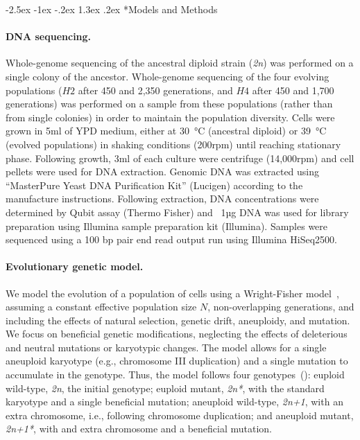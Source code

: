 \documentclass[12pt]{extarticle}
\makeatletter
\renewcommand\section{\@startsection {section}{1}{\z@}%
     {-2.5ex \@plus -1ex \@minus -.2ex}%
     {1.3ex \@plus.2ex}%
    {\Large\bfseries}}
\newcommand{\euwt}{\emph{2n}}
\newcommand{\anwt}{\emph{2n+1}}
\newcommand{\eumt}{\emph{2n*}}
\newcommand{\anmt}{\emph{2n+1*}}
\makeatother
\begin{document}
\section*{Models and Methods}

\paragraph{DNA sequencing.}
Whole-genome sequencing of the ancestral diploid strain (\euwt) was performed
on a single colony of the ancestor. Whole-genome sequencing of the four evolving populations ($H2$ after 450 and 2,350 generations, and $H4$ after 450 and 1,700 generations) was performed on a sample from these populations (rather than from single colonies) in order to maintain the population diversity. Cells were grown in 5ml of YPD medium, either at \SI{30}{\celsius} (ancestral diploid) or \SI{39}{\celsius} (evolved populations) in shaking conditions (200rpm) until reaching stationary phase. Following growth, 3ml of each culture were centrifuge (14,000rpm) and cell pellets were used for DNA extraction. 
Genomic DNA was extracted using “MasterPure Yeast DNA Purification Kit” (Lucigen) according to the manufacture instructions. Following extraction, DNA concentrations were determined by Qubit assay (Thermo Fisher) and ~1µg DNA was used for library preparation using Illumina sample preparation kit (Illumina). Samples were sequenced using a 100 bp pair end read output run using Illumina HiSeq2500.  

\paragraph{Evolutionary genetic model.}
We model the evolution of a population of cells using a Wright-Fisher model~\citep{Otto2007}, assuming a constant effective population size $N$, non-overlapping generations, and including the effects of natural selection, genetic drift, aneuploidy, and mutation. 
We focus on beneficial genetic modifications, neglecting the effects of deleterious and neutral mutations or karyotypic changes.
The model allows for a single aneuploid karyotype (e.g., chromosome III duplication) and a single mutation to accumulate in the genotype.
Thus, the model follows four genotypes~(): euploid wild-type, \euwt, the initial genotype; 
euploid mutant, \eumt, with the standard karyotype and a single beneficial mutation; 
aneuploid wild-type, \anwt, with an extra chromosome, i.e., following chromosome duplication; and
aneuploid mutant, \anmt, with and extra chromosome and a beneficial mutation. 
\end{document}
